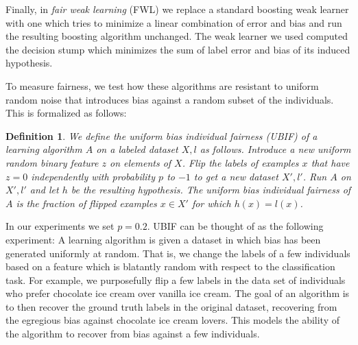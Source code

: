 \documentclass{article}
\newtheorem{definition}{Definition}
\begin{document}
Finally, in \emph{fair weak learning} (FWL) we replace a standard boosting weak
learner with one which tries to minimize a linear combination of error and bias
and run the resulting boosting algorithm unchanged. The weak learner we used
computed the decision stump which minimizes the sum of label error and bias of
its induced hypothesis.

To measure fairness, we test how these algorithms are resistant to uniform random noise
that introduces bias against a random subset of the individuals.
This is formalized as follows:


\begin{definition}
We define the \emph{uniform bias individual fairness} (UBIF) of a learning
algorithm $A$ on a labeled dataset $X,l$ as follows. Introduce a new uniform
random binary feature $z$ on elements of $X$. Flip the labels of examples $x$
that have $z=0$ independently with probability $p$ to $-1$ to get a new dataset $X',
l'$. Run $A$ on $X', l'$ and let $h$ be the resulting hypothesis. The
uniform bias individual fairness of $A$ is the fraction of flipped examples $x
\in X'$ for which $h(x) = l(x)$. 
\end{definition}

In our experiments we set $p = 0.2$.  UBIF can be thought of as the following experiment:  
A learning algorithm is given a dataset in which bias has been generated uniformly at random.  That is, we change the labels of a few individuals based on a feature which is blatantly random with respect to the classification task.  For example, we purposefully flip a few labels in the data set of individuals who prefer chocolate ice cream over vanilla ice cream.  The goal
of an algorithm is to then recover the ground truth labels in the original
dataset, recovering from the egregious bias against chocolate ice cream lovers.  This models the ability of the algorithm to recover from bias against a few individuals.
\end{document}
